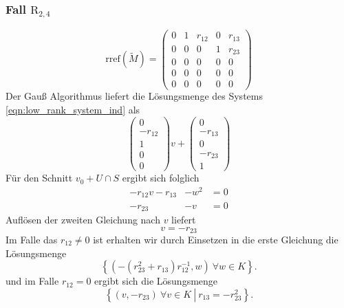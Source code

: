 \documentclass[a4paper,oneside, 11pt, openany%
]{article}
\theoremstyle{custom}
\theoremstyle{custom}
\begin{document}
\subsubsection*{Fall $\text{R}_{2,4}$}
\begin{equation*}\label{eqn:rref_r24}
	\text{rref}(\tilde{M}) =
	\left( \begin{array}{ccccc}
		0&1&r_{12}&0&r_{13}\\
		0&0&0&1&r_{23}\\
		0&0&0&0&0\\
		0&0&0&0&0\\
		0&0&0&0&0
	\end{array}\right)
\end{equation*}
Der Gauß Algorithmus liefert die Lösungsmenge des Systems \eqref{eqn:low_rank_system_ind} als
\begin{equation*}
	\begin{pmatrix}
		0\\
		-r_{12}\\
		1\\
		0\\
		0
	\end{pmatrix}v +
	\begin{pmatrix}
		0\\
		-r_{13}\\
		0\\
		-r_{23}\\
		1
	\end{pmatrix}
\end{equation*}
Für den Schnitt $v_0 + U \cap S $ ergibt sich folglich
\begin{equation*}
	\begin{alignedat}{2}
		-r_{12}v-r_{13}&-w^2&=0\\
		-r_{23}&-v&=0
	\end{alignedat}
\end{equation*}
Auflösen der zweiten Gleichung nach $v$ liefert
\begin{equation*}
	v=-r_{23}
\end{equation*}
Im Falle das $r_{12} \neq 0$ ist erhalten wir durch Einsetzen in die erste Gleichung die Lösungsmenge
\begin{equation*}
	\left\lbrace \left(-\left( r_{23}^2+r_{13}\right)r_{12}^{-1},w\right) \ \forall w \in K \right\rbrace .
\end{equation*} 
und im Falle $r_{12} = 0$ ergibt sich die Lösungsmenge
\begin{equation*}
	\left\lbrace (v,-r_{23}) \ \forall v \in K \ \left| \ r_{13}=-r_{23}^2 \right.\right\rbrace .
\end{equation*} 	
\end{document}

